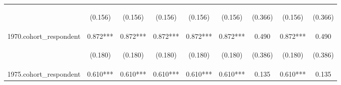 \begin{center}
\begin{tabular}{lcccccccc}
\vspace{4pt} & \begin{footnotesize}(0.156)\end{footnotesize} & \begin{footnotesize}(0.156)\end{footnotesize} & \begin{footnotesize}(0.156)\end{footnotesize} & \begin{footnotesize}(0.156)\end{footnotesize} & \begin{footnotesize}(0.156)\end{footnotesize} & \begin{footnotesize}(0.366)\end{footnotesize} & \begin{footnotesize}(0.156)\end{footnotesize} & \begin{footnotesize}(0.366)\end{footnotesize} \\
1970.cohort\_respondent & 0.872*** & 0.872*** & 0.872*** & 0.872*** & 0.872*** & 0.490 & 0.872*** & 0.490 \\
\vspace{4pt} & \begin{footnotesize}(0.180)\end{footnotesize} & \begin{footnotesize}(0.180)\end{footnotesize} & \begin{footnotesize}(0.180)\end{footnotesize} & \begin{footnotesize}(0.180)\end{footnotesize} & \begin{footnotesize}(0.180)\end{footnotesize} & \begin{footnotesize}(0.386)\end{footnotesize} & \begin{footnotesize}(0.180)\end{footnotesize} & \begin{footnotesize}(0.386)\end{footnotesize} \\
1975.cohort\_respondent & 0.610*** & 0.610*** & 0.610*** & 0.610*** & 0.610*** & 0.135 & 0.610*** & 0.135 \\

\end{tabular}
\end{center}
